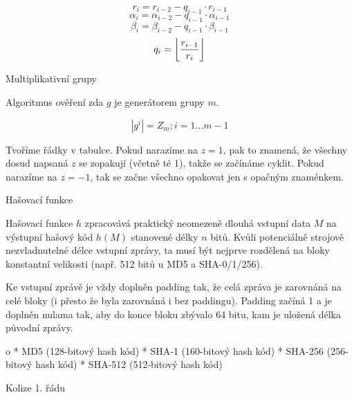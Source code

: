 $$r_i = r_{i-2} - q_{i-1} \cdot r_{i-1}$$
$$\alpha_i = \alpha_{i-2} - q_{i-1} \cdot \alpha_{i-1}$$
$$\beta_i = \beta_{i-2} - q_{i-1} \cdot \beta_{i-1}$$
$$q_i = \left\lfloor r_{i-1} \over r_i \right\rfloor$$

\endmulti

\sec Multiplikativní grupy

Algoritmus ověření zda $g$ je generátorem grupy $m$.

$$\left|g^i\right| = Z_m; i = 1 \ldots m - 1$$

\noindent
Tvoříme řádky v tabulce. Pokud narazíme na $z = 1$, pak to znamená, že všechny dosud napsaná $z$ se zopakují (včetně té 1), takže se začínáme cyklit. Pokud narazíme na $z = -1$, tak se začne všechno opakovat jen s opačným znaménkem.


\chap Hašovací funkce

Hašovací funkce $h$ zpracovává praktický neomezeně dlouhá vstupní data $M$ na výstupní hašový kód $h(M)$ stanovené délky $n$ bitů.
Kvůli potenciálně strojově nezvladnutelné délce vstupní zprávy, ta musí být nejprve rozdělená na bloky konstantní velikosti (např. 512 bitů u MD5 a SHA-0/1/256).

Ke vstupní zprávě je vždy doplněn padding tak, že celá zpráva je zarovnáná na celé bloky (i přesto že byla zarovnáná i bez paddingu). Padding začíná 1 a je doplněn nulama tak, aby do konce bloku zbývalo 64 bitu, kam je uložená délka původní zprávy.

\begitems \style o
* MD5 (128-bitový hash kód)
* SHA-1 (160-bitový hash kód)
* SHA-256 (256-bitový hash kód)
* SHA-512 (512-bitový hash kód)
\enditems



\sec Kolize 1. řádu

